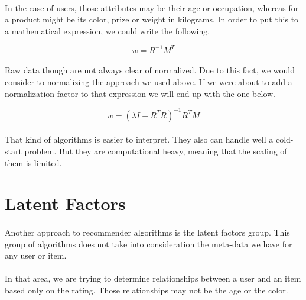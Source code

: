 \paragraph{}In the case of users, those attributes may be their age or occupation, whereas for a product might be its color, prize or weight in kilograms. In order to put this to a mathematical expression, we could write the following.

\begin{equation}
w=R^{-1}M^{T}
\end{equation}

\paragraph{}Raw data though are not always clear of normalized. Due to this fact, we would consider to normalizing the approach we used above. If we were about to add a normalization factor to that expression we will end up with the one below.

\begin{equation}
w=(\lambda I + R^{T}R)^{-1} R^{T}M 
\end{equation}

\paragraph{}That kind of algorithms is easier to interpret. They also can handle well a cold-start problem. But they are computational heavy, meaning that the scaling of them is limited.

\section{Latent Factors}

\paragraph{}Another approach to recommender algorithms is the latent factors group. This group of algorithms does not take into consideration the meta-data we have for any user or item. 
\paragraph{}In that area, we are trying to determine relationships between a user and an item based only on the rating. Those relationships may not be the age or the color.

